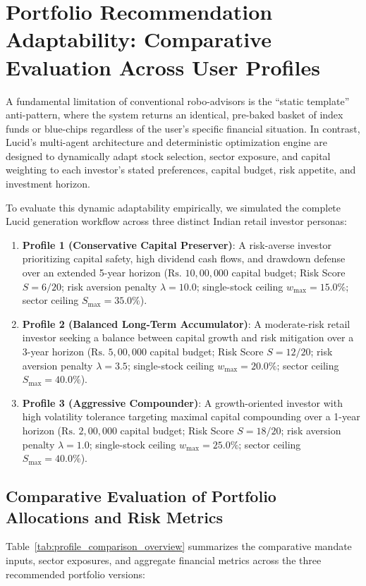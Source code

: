 \section{Portfolio Recommendation Adaptability: Comparative Evaluation Across User Profiles}
\label{sec:portfolio_comparison_profiles}
A fundamental limitation of conventional robo-advisors is the ``static template'' anti-pattern, where the system returns an identical, pre-baked basket of index funds or blue-chips regardless of the user's specific financial situation. In contrast, Lucid's multi-agent architecture and deterministic optimization engine are designed to dynamically adapt stock selection, sector exposure, and capital weighting to each investor's stated preferences, capital budget, risk appetite, and investment horizon.

To evaluate this dynamic adaptability empirically, we simulated the complete Lucid generation workflow across three distinct Indian retail investor personas:
\begin{enumerate}
    \item \textbf{Profile 1 (Conservative Capital Preserver)}: A risk-averse investor prioritizing capital safety, high dividend cash flows, and drawdown defense over an extended 5-year horizon ($\text{Rs.~}10,00,000$ capital budget; Risk Score $S = 6/20$; risk aversion penalty $\lambda = 10.0$; single-stock ceiling $w_{\max} = 15.0\%$; sector ceiling $S_{\max} = 35.0\%$).
    \item \textbf{Profile 2 (Balanced Long-Term Accumulator)}: A moderate-risk retail investor seeking a balance between capital growth and risk mitigation over a 3-year horizon ($\text{Rs.~}5,00,000$ capital budget; Risk Score $S = 12/20$; risk aversion penalty $\lambda = 3.5$; single-stock ceiling $w_{\max} = 20.0\%$; sector ceiling $S_{\max} = 40.0\%$).
    \item \textbf{Profile 3 (Aggressive Compounder)}: A growth-oriented investor with high volatility tolerance targeting maximal capital compounding over a 1-year horizon ($\text{Rs.~}2,00,000$ capital budget; Risk Score $S = 18/20$; risk aversion penalty $\lambda = 1.0$; single-stock ceiling $w_{\max} = 25.0\%$; sector ceiling $S_{\max} = 40.0\%$).
\end{enumerate}

\subsection{Comparative Evaluation of Portfolio Allocations and Risk Metrics}
Table~\ref{tab:profile_comparison_overview} summarizes the comparative mandate inputs, sector exposures, and aggregate financial metrics across the three recommended portfolio versions:

